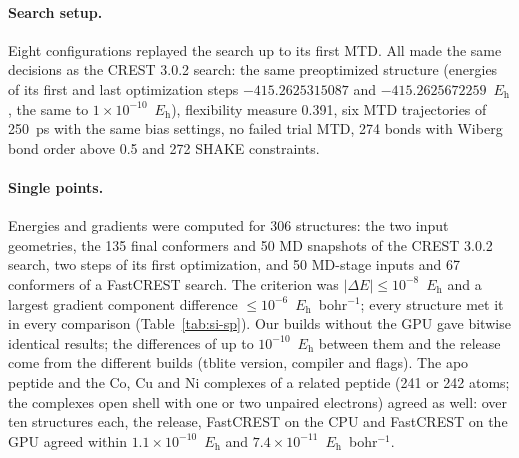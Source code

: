 \documentclass[journal=jctcce,manuscript=suppinfo]{achemso}
\newcommand{\Eh}{\ensuremath{E_\mathrm{h}}}
\begin{document}
\paragraph{Search setup.} Eight configurations replayed the search up to its first MTD. All made the same decisions as the
CREST 3.0.2 search: the same preoptimized structure (energies of its first and last optimization steps $-415.2625315087$
and $-415.2625672259$~\Eh, the same to $1\times10^{-10}$~\Eh), flexibility measure 0.391, six MTD trajectories of
250~ps with the same bias settings, no failed trial MTD, 274 bonds with Wiberg bond order above 0.5 and 272 SHAKE
constraints.

\paragraph{Single points.} Energies and gradients were computed for 306 structures: the two input geometries, the 135
final conformers and 50 MD snapshots of the CREST 3.0.2 search, two steps of its first optimization, and 50 MD-stage
inputs and 67 conformers of a FastCREST search. The criterion was $|\Delta E| \le 10^{-8}$~\Eh{} and a largest gradient
component difference $\le 10^{-6}$~\Eh~bohr$^{-1}$; every structure met it in every comparison (Table~\ref{tab:si-sp}).
Our builds without the GPU gave bitwise identical results; the differences of up to $10^{-10}$~\Eh{} between them and the release come from
the different builds (tblite version, compiler and flags). The apo peptide and the Co, Cu and Ni complexes of a related peptide (241 or 242 atoms; the complexes open shell with one or two unpaired electrons) agreed as well: over ten structures each,
the release, FastCREST on the CPU and FastCREST on the GPU agreed within $1.1\times10^{-10}$~\Eh{} and
$7.4\times10^{-11}$~\Eh~bohr$^{-1}$.
\end{document}
